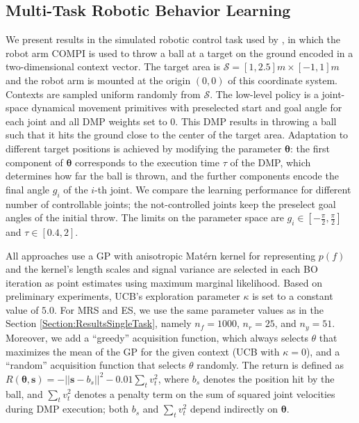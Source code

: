 \documentclass[10pt,letterpaper]{article} %
\begin{document}
\subsection{Multi-Task Robotic Behavior Learning} \label{Section:ResultsMultiTask}

We present results in the simulated robotic control task used by
\citet{metzen_active_2015}, in which the robot arm COMPI \cite{COMPI} is used to
throw a ball at a target on the ground encoded in a two-dimensional context
vector. The target area is $\mathcal{S} = [1, 2.5]m \times [-1, 1]m$ and the robot arm is
mounted at the origin $(0, 0)$ of this coordinate system. Contexts are sampled uniform randomly from $\mathcal{S}$.
The low-level policy is a joint-space dynamical movement primitives
\citep[DMP,][]{ijspeert_dynamical_2013} with preselected start and goal angle
for each joint and all DMP weights set to 0. This DMP results in throwing a ball
such that it hits the ground close to the center of the target area. Adaptation
to different target positions is achieved by modifying the parameter
$\mathbf{\theta}$: the first component of $\mathbf{\theta}$ corresponds to the
execution time $\tau$ of the DMP, which determines how far the ball is thrown,
and the further components encode the final angle $g_i$ of the $i$-th joint.
We compare the learning performance for different number of controllable joints;
the not-controlled joints keep the preselect goal angles of the initial throw.
The limits on the parameter space are $g_i \in \left[-\frac{\pi}{2}, \frac{\pi}{2}\right]$ and $\tau \in \left[0.4, 2\right]$.

All approaches use a GP with anisotropic Mat{\'e}rn kernel for representing
$p(f)$ and the kernel's length scales and signal variance are selected in each 
BO iteration as point estimates using maximum marginal likelihood. Based on preliminary experiments,
UCB's exploration parameter $\kappa$ is set to a
constant value of $5.0$. For MRS and ES, we use the same parameter values as in
the Section \ref{Section:ResultsSingleTask}, namely $n_f=1000$, $n_r=25$, and $n_y=51$. Moreover, we
add a ``greedy'' acquisition function, which always selects $\theta$ that
maximizes the mean of the GP for the given context (UCB with $\kappa=0$), and a
``random'' acquisition function that selects $\theta$ randomly. The return is
defined as $R(\mathbf{\theta}, \mathbf{s}) = -||\mathbf{s} - b_s||^2 - 0.01
\sum_t v_t^2$, where $b_s$ denotes the position hit by the ball, and $\sum_t
v_t^2$ denotes a penalty term on the sum of squared joint velocities during DMP
execution; both $b_s$ and $\sum_t v_t^2$ depend indirectly on $\mathbf{\theta}$.
\end{document}
